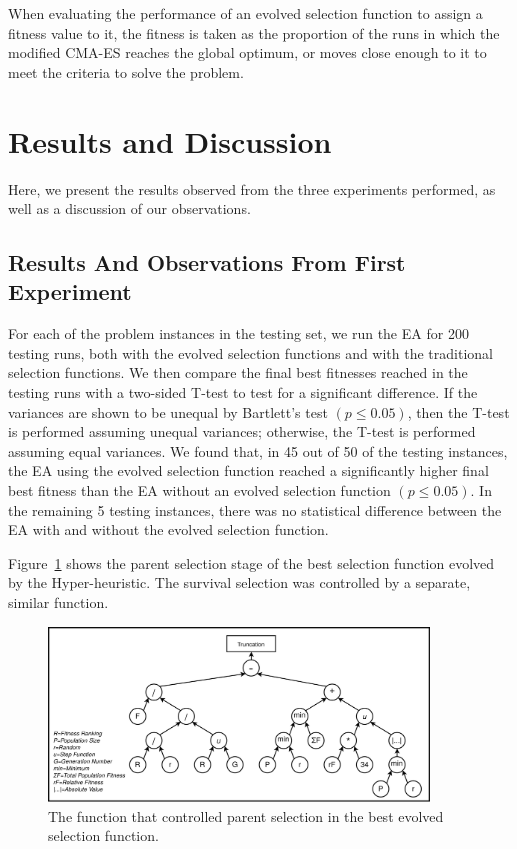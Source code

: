 \documentclass[sigconf]{acmart}
\begin{document}
When evaluating the performance of an evolved selection function to assign a fitness value to it, the fitness is taken as the proportion of the runs in which the modified CMA-ES reaches the global optimum, or moves close enough to it to meet the criteria to solve the problem.

\section{Results and Discussion}
\label{Results}
Here, we present the results observed from the three experiments performed, as well as a discussion of our observations.

\subsection{Results And Observations From First Experiment}
\label{firstExperimentResults}

For each of the problem instances in the testing set, we run the EA for 200 testing runs, both with the evolved selection functions and with the traditional selection functions. We then compare the final best fitnesses reached in the testing runs with a two-sided T-test to test for a significant difference. If the variances are shown to be unequal by Bartlett's test $(p \leq 0.05)$, then the T-test is performed assuming unequal variances; otherwise, the T-test is performed assuming equal variances. We found that, in 45 out of 50 of the testing instances, the EA using the evolved selection function reached a significantly higher final best fitness than the EA without an evolved selection function $(p \leq 0.05)$. In the remaining 5 testing instances, there was no statistical difference between the EA with and without the evolved selection function.

Figure~\ref{fig:experiment1Result} shows the parent selection stage of the best selection function evolved by the Hyper-heuristic. The survival selection was controlled by a separate, similar function.

\begin{figure}
	\centering
	\includegraphics[width=0.9\textwidth]{experiment1Result}
	\caption{The function that controlled parent selection in the best evolved selection function.}
	\label{fig:experiment1Result}
\end{figure}
\end{document}
